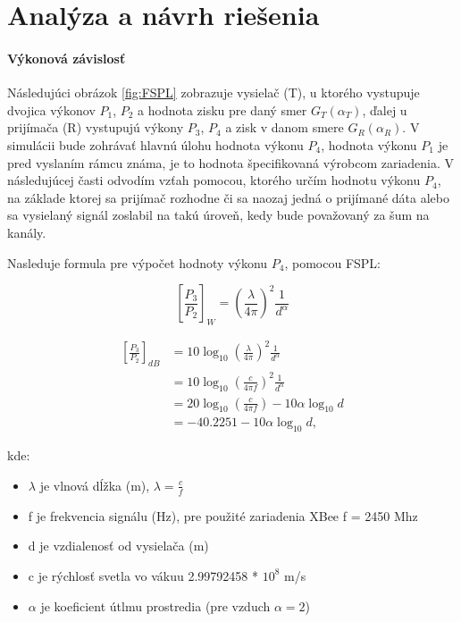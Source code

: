 \documentclass[11pt,twoside,a4paper]{book}
\begin{document}
\chapter{Analýza a návrh riešenia}


\subsubsection{Výkonová závislosť}

Následujúci obrázok \ref{fig:FSPL} zobrazuje vysielač (T), u ktorého vystupuje dvojica výkonov $P_{1}$, $P_{2}$ a hodnota zisku pre daný smer $G_{T}(\alpha_{T})$, ďalej u prijímača (R) vystupujú výkony $P_{3}$, $P_{4}$ a zisk v danom smere $G_{R}(\alpha_{R})$. V simulácii bude zohrávať hlavnú úlohu hodnota výkonu $P_{4}$, hodnota výkonu $P_{1}$ je pred vyslaním rámcu známa, je to hodnota špecifikovaná výrobcom zariadenia. V následujúcej časti odvodím vzťah pomocou, ktorého určím hodnotu výkonu $P_{4}$, na základe ktorej sa prijímač rozhodne či sa naozaj jedná o prijímané dáta alebo sa vysielaný signál zoslabil na takú úroveň, kedy bude považovaný za šum na kanály.

Nasleduje formula pre výpočet hodnoty výkonu $P_{4}$, pomocou FSPL:

\[
\left[\frac{P_{3}}{P_{2}}\right]_{W} =\left(\frac{\lambda}{4\pi}\right)^{2}\frac{1}{d^{\alpha}}
\]

\begin{align*}
\left[\frac{P_{3}}{P_{2}}\right]_{dB} &= 10\log_{10}\left(\frac{\lambda}{4\pi}\right)^{2}\frac{1}{d^{\alpha}} \\
&= 10\log_{10}\left(\frac{c}{4\pi f}\right)^{2}\frac{1}{d^{\alpha}} \\
&= 20\log_{10}\left(\frac{c}{4\pi f}\right)-10\alpha\log_{10}d \\
&= -40.2251-10\alpha\log_{10}d, 
\end{align*}

kde:
\begin{itemize}
 \item $\lambda$ je vlnová dĺžka (m), $\lambda = \frac{c}{f}$
 \item f je frekvencia signálu (Hz), pre použité zariadenia XBee f = 2450 Mhz
 \item d je vzdialenosť od vysielača (m)
 \item c je rýchlosť svetla vo vákuu 2.99792458 * $10^{8}$ m/s
 \item $\alpha$ je koeficient útlmu prostredia (pre vzduch $\alpha = 2$)
\end{itemize}
\end{document}
